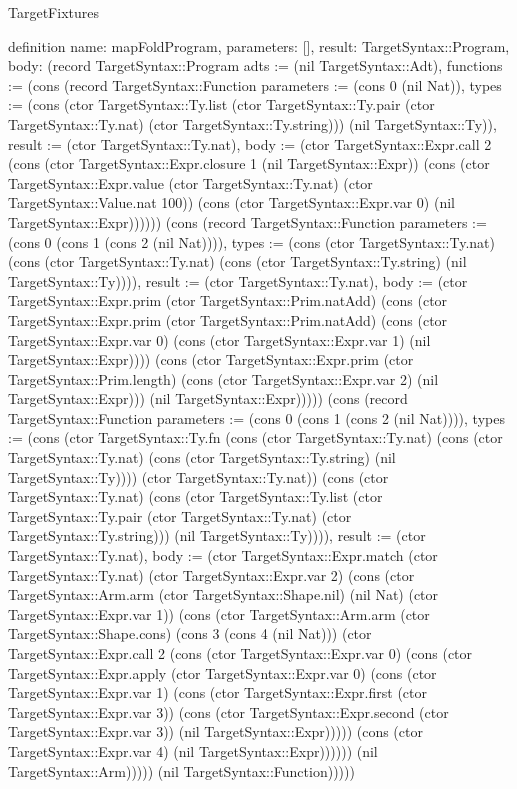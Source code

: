 \begin{lexlean}{TargetFixtures}
\begin{semanticmodule}
definition{
  name: mapFoldProgram,
  parameters: [],
  result: TargetSyntax::Program,
  body: (record TargetSyntax::Program {adts := (nil TargetSyntax::Adt), functions := (cons (record TargetSyntax::Function {parameters := (cons 0 (nil Nat)), types := (cons (ctor TargetSyntax::Ty.list (ctor TargetSyntax::Ty.pair (ctor TargetSyntax::Ty.nat) (ctor TargetSyntax::Ty.string))) (nil TargetSyntax::Ty)), result := (ctor TargetSyntax::Ty.nat), body := (ctor TargetSyntax::Expr.call 2 (cons (ctor TargetSyntax::Expr.closure 1 (nil TargetSyntax::Expr)) (cons (ctor TargetSyntax::Expr.value (ctor TargetSyntax::Ty.nat) (ctor TargetSyntax::Value.nat 100)) (cons (ctor TargetSyntax::Expr.var 0) (nil TargetSyntax::Expr)))))}) (cons (record TargetSyntax::Function {parameters := (cons 0 (cons 1 (cons 2 (nil Nat)))), types := (cons (ctor TargetSyntax::Ty.nat) (cons (ctor TargetSyntax::Ty.nat) (cons (ctor TargetSyntax::Ty.string) (nil TargetSyntax::Ty)))), result := (ctor TargetSyntax::Ty.nat), body := (ctor TargetSyntax::Expr.prim (ctor TargetSyntax::Prim.natAdd) (cons (ctor TargetSyntax::Expr.prim (ctor TargetSyntax::Prim.natAdd) (cons (ctor TargetSyntax::Expr.var 0) (cons (ctor TargetSyntax::Expr.var 1) (nil TargetSyntax::Expr)))) (cons (ctor TargetSyntax::Expr.prim (ctor TargetSyntax::Prim.length) (cons (ctor TargetSyntax::Expr.var 2) (nil TargetSyntax::Expr))) (nil TargetSyntax::Expr))))}) (cons (record TargetSyntax::Function {parameters := (cons 0 (cons 1 (cons 2 (nil Nat)))), types := (cons (ctor TargetSyntax::Ty.fn (cons (ctor TargetSyntax::Ty.nat) (cons (ctor TargetSyntax::Ty.nat) (cons (ctor TargetSyntax::Ty.string) (nil TargetSyntax::Ty)))) (ctor TargetSyntax::Ty.nat)) (cons (ctor TargetSyntax::Ty.nat) (cons (ctor TargetSyntax::Ty.list (ctor TargetSyntax::Ty.pair (ctor TargetSyntax::Ty.nat) (ctor TargetSyntax::Ty.string))) (nil TargetSyntax::Ty)))), result := (ctor TargetSyntax::Ty.nat), body := (ctor TargetSyntax::Expr.match (ctor TargetSyntax::Ty.nat) (ctor TargetSyntax::Expr.var 2) (cons (ctor TargetSyntax::Arm.arm (ctor TargetSyntax::Shape.nil) (nil Nat) (ctor TargetSyntax::Expr.var 1)) (cons (ctor TargetSyntax::Arm.arm (ctor TargetSyntax::Shape.cons) (cons 3 (cons 4 (nil Nat))) (ctor TargetSyntax::Expr.call 2 (cons (ctor TargetSyntax::Expr.var 0) (cons (ctor TargetSyntax::Expr.apply (ctor TargetSyntax::Expr.var 0) (cons (ctor TargetSyntax::Expr.var 1) (cons (ctor TargetSyntax::Expr.first (ctor TargetSyntax::Expr.var 3)) (cons (ctor TargetSyntax::Expr.second (ctor TargetSyntax::Expr.var 3)) (nil TargetSyntax::Expr))))) (cons (ctor TargetSyntax::Expr.var 4) (nil TargetSyntax::Expr)))))) (nil TargetSyntax::Arm))))}) (nil TargetSyntax::Function))))})
}


\end{semanticmodule}
\end{lexlean}
